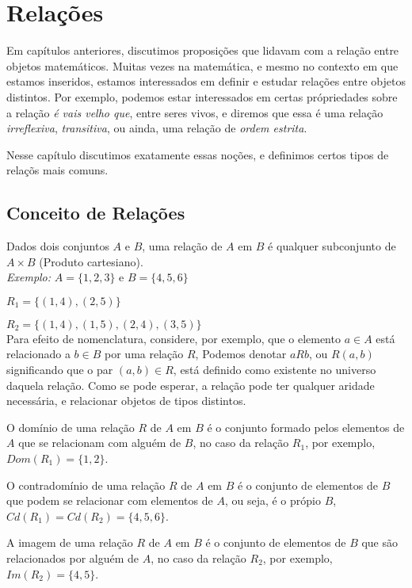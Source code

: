 \chapter{Relações}
Em capítulos anteriores, discutimos proposições que lidavam com a relação entre objetos matemáticos. Muitas vezes na matemática, e mesmo no contexto em que estamos inseridos, estamos interessados em definir e estudar relações entre objetos distintos. Por exemplo, podemos estar interessados em certas própriedades sobre a relação \textit{é vais velho que}, entre seres vivos, e diremos que essa é uma relação \textit{irreflexiva}, \textit{transitiva}, ou ainda, uma relação de \textit{ordem estrita}.

Nesse capítulo discutimos exatamente essas noções, e definimos certos tipos de relaçõs mais comuns.

\section{Conceito de Relações}

Dados dois conjuntos $A$ e $B$, uma relação de $A$ em $B$ é qualquer subconjunto de $A\times B$ (Produto  cartesiano).\\

\textit{Exemplo:} $A = \{1,2,3\} $ e $ B = \{4,5,6\}$

$R_{1} = \{(1,4),(2,5)\}$

$R_{2} = \{(1,4),(1,5),(2,4),(3,5)\}$\\

Para efeito de nomenclatura, considere, por exemplo, que o elemento $a \in A$ está relacionado a $b \in B$ por uma relação $R$, Podemos denotar $aRb$, ou $R(a,b)$ significando que o par $(a,b)\in R$, está definido como existente no universo daquela relação. Como se pode esperar, a relação pode ter qualquer aridade necessária, e relacionar objetos de tipos distintos.

O domínio de uma relação $R$ de $A$ em $B$ é o conjunto formado pelos elementos de $A$ que se relacionam com alguém de $B$, no caso da relação $R_{1}$, por exemplo, $Dom(R_{1}) = \{1,2\}$.

O contradomínio de uma relação $R$ de $A$ em $B$ é o conjunto de elementos de $B$ que podem se relacionar com elementos de $A$, ou seja, é o própio $B$, $Cd(R_{1}) = Cd(R_{2}) =  \{4,5,6\}$.

A imagem de uma relação $R$ de $A$ em $B$ é o conjunto de elementos de $B$ que são relacionados por alguém de $A$, no caso da relação $R_{2}$, por exemplo, $Im(R_{2}) = \{4,5\}$.

